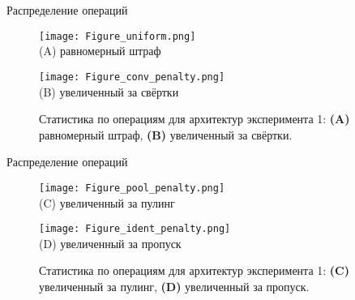 \documentclass{beamer}
\begin{document}
\begin{frame}{Распределение операций}

\begin{figure}[!ht]
    \centering
    \begin{minipage}[t]{0.48\linewidth}
        \centering
        \texttt{[image: Figure\_uniform.png]}\\
        (A) равномерный штраф
    \end{minipage}\hfill
    \begin{minipage}[t]{0.48\linewidth}
        \centering
        \texttt{[image: Figure\_conv\_penalty.png]}\\
        (B) увеличенный за свёртки
    \end{minipage}
    \caption{Статистика по операциям для архитектур эксперимента 1: 
             \textbf{(A)} равномерный штраф, 
             \textbf{(B)} увеличенный за свёртки.
             }
    \label{fig2}
\end{figure}
    
\end{frame}
\begin{frame}{Распределение операций}

\begin{figure}[!ht]
    \centering
    \begin{minipage}[t]{0.48\linewidth}
        \centering
        \texttt{[image: Figure\_pool\_penalty.png]}\\
        (C) увеличенный за пулинг
    \end{minipage}\hfill
    \begin{minipage}[t]{0.48\linewidth}
        \centering
        \texttt{[image: Figure\_ident\_penalty.png]}\\
        (D) увеличенный за пропуск
    \end{minipage}

    \caption{Статистика по операциям для архитектур эксперимента 1: 
             \textbf{(C)} увеличенный за пулинг, 
             \textbf{(D)} увеличенный за пропуск.}
    \label{fig3}
\end{figure}
    
\end{frame}
\end{document}
